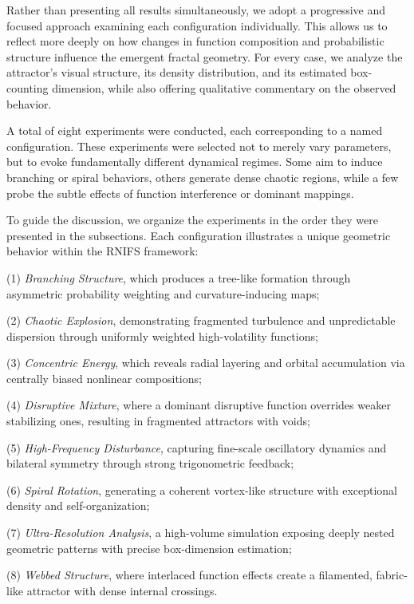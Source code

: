 \documentclass[twocolumn,10pt]{article}
\begin{document}
Rather than presenting all results simultaneously, we adopt a progressive and focused approach examining each configuration individually. This allows us to reflect more deeply on how changes in function composition and probabilistic structure influence the emergent fractal geometry. For every case, we analyze the attractor’s visual structure, its density distribution, and its estimated box-counting dimension, while also offering qualitative commentary on the observed behavior.

A total of eight experiments were conducted, each corresponding to a named configuration. These experiments were selected not to merely vary parameters, but to evoke fundamentally different dynamical regimes. Some aim to induce branching or spiral behaviors, others generate dense chaotic regions, while a few probe the subtle effects of function interference or dominant mappings.

To guide the discussion, we organize the experiments in the order they were presented in the subsections. Each configuration illustrates a unique geometric behavior within the RNIFS framework:

(1) \textit{Branching Structure}, which produces a tree-like formation through asymmetric probability weighting and curvature-inducing maps;

(2) \textit{Chaotic Explosion}, demonstrating fragmented turbulence and unpredictable dispersion through uniformly weighted high-volatility functions;

(3) \textit{Concentric Energy}, which reveals radial layering and orbital accumulation via centrally biased nonlinear compositions;

(4) \textit{Disruptive Mixture}, where a dominant disruptive function overrides weaker stabilizing ones, resulting in fragmented attractors with voids;

(5) \textit{High-Frequency Disturbance}, capturing fine-scale oscillatory dynamics and bilateral symmetry through strong trigonometric feedback;

(6) \textit{Spiral Rotation}, generating a coherent vortex-like structure with exceptional density and self-organization;

(7) \textit{Ultra-Resolution Analysis}, a high-volume simulation exposing deeply nested geometric patterns with precise box-dimension estimation;

(8) \textit{Webbed Structure}, where interlaced function effects create a filamented, fabric-like attractor with dense internal crossings.
\end{document}
